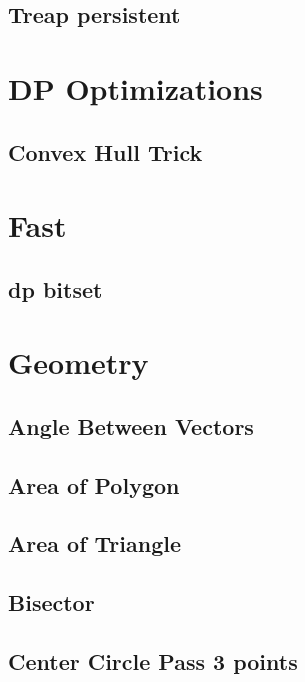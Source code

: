 ﻿\documentclass[10pt,twocolumn]{article}
\newcommand{\codefile}[1]{}}
\begin{document}
\subsection{Treap persistent}
\codefile{Data Structure/Treap persistent.cpp}

\section{DP Optimizations}
\subsection{Convex Hull Trick}
\codefile{DP Optimization/Convex Hull Trick.cpp}

\section{Fast}
\subsection{dp bitset}
\codefile{fast/dp bitset.cpp}

\section{Geometry}
\subsection{Angle Between Vectors}
\codefile{Geometry/Angle Between Vectors.cpp}

\subsection{Area of Polygon}
\codefile{Geometry/Area of Polygon.cpp}

\subsection{Area of Triangle}
\codefile{Geometry/Area of Triangle.cpp}

\subsection{Bisector}
\codefile{Geometry/Bisector.cpp}

\subsection{Center Circle Pass 3 points}
\codefile{Geometry/Center Circle Pass 3 points.cpp}
\end{document}
